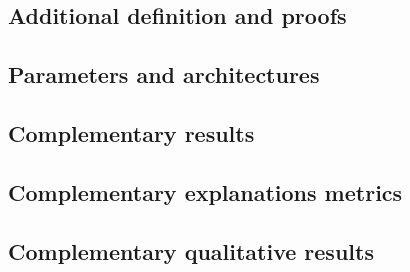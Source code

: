 \subsection{Additional definition and proofs}
\label{ann:def_and_proof}

\newpage 

\subsection{Parameters and architectures}
\label{ann:parameters}

\newpage 

\subsection{Complementary results}
\label{ann:complementary_results}


\newpage 

\subsection{Complementary explanations metrics}
\label{ann:explanation_metrics}


\newpage 

\subsection{Complementary qualitative results}
\label{ann:qualitative_results}


